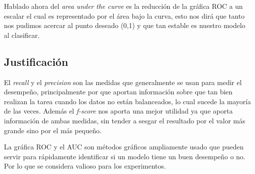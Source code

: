 \par Hablado ahora del \textit{area under the curve} es la reducción de la gráfica ROC a un escalar el cual es representado por el área bajo la curva, esto nos dirá que tanto nos pudimos acercar al punto deseado (0,1) y que tan estable es nuestro modelo al clasificar.

\subsection{Justificación}	

\par El \textit{recall} y el \textit{precision} son las medidas que generalmente se usan para medir el desempeño, principalmente por que aportan información sobre que tan bien realizan la tarea cuando los datos no están balanceados, lo cual sucede la mayoría de las veces. Además el \textit{f-score} nos aporta una mejor utilidad ya que aporta información de ambas medidas, sin tender a sesgar el resultado por el valor más grande sino por el más pequeño.

\par La gráfica ROC y el AUC son métodos gráficos ampliamente usado que pueden servir para rápidamente identificar si un modelo tiene un buen desempeño o no. Por lo que se considera valioso para los experimentos.

